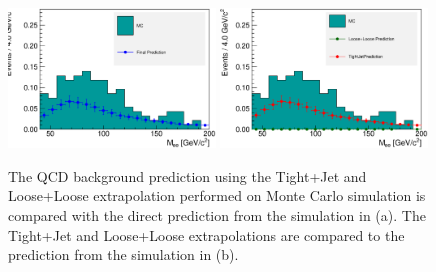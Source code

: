 \documentclass{cmspaper}
\begin{document}
\begin{figure}[htb]
\begin{center}
\includegraphics[width=0.49\textwidth]{MCBkgFakeRatePrediction_WJets_FinalVsMC.eps}
\includegraphics[width=0.49\textwidth]{MCBkgFakeRatePrediction_WJets_LooseLooseTightJetVsMC.eps}
   \caption{The QCD background prediction using the Tight+Jet and Loose+Loose extrapolation performed on Monte Carlo simulation is compared with the direct prediction from the simulation in (a). The Tight+Jet and Loose+Loose extrapolations are compared to the prediction from the simulation in (b). }
   \label{fig:ZeeWJetsBkgPrediction_MC}
\end{center}
\end{figure}
\end{document}
